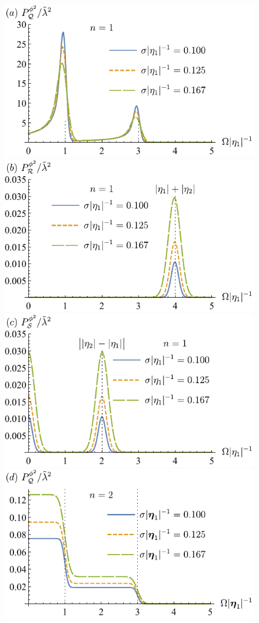\documentclass[11pt,prd,onecolumn,superscriptaddress,nofootinbib,floatfix,amsmath,amssymb]{revtex4-2}
\begin{document}
    \begin{figure}[tp]
        \centering
        \includegraphics[scale=0.64]{Fig6a.pdf}
        \includegraphics[scale=0.64]{Fig6b.pdf}
        \includegraphics[scale=0.64]{Fig6c.pdf}
        \includegraphics[scale=0.64]{Fig6d.pdf}

\end{figure}
\end{document}
